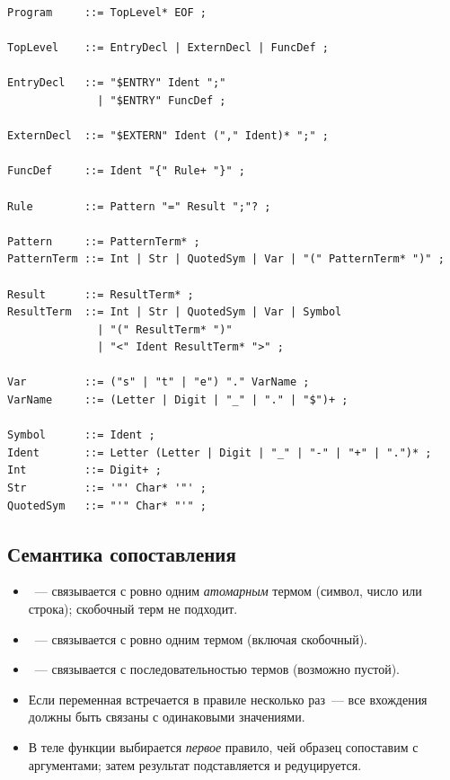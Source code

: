 \begin{lstlisting}[language={},caption={EBNF-грамматика базисного подмножества Refal-5},label={lst:ebnf}]
Program     ::= TopLevel* EOF ;

TopLevel    ::= EntryDecl | ExternDecl | FuncDef ;

EntryDecl   ::= "$ENTRY" Ident ";"
              | "$ENTRY" FuncDef ;

ExternDecl  ::= "$EXTERN" Ident ("," Ident)* ";" ;

FuncDef     ::= Ident "{" Rule+ "}" ;

Rule        ::= Pattern "=" Result ";"? ;

Pattern     ::= PatternTerm* ;
PatternTerm ::= Int | Str | QuotedSym | Var | "(" PatternTerm* ")" ;

Result      ::= ResultTerm* ;
ResultTerm  ::= Int | Str | QuotedSym | Var | Symbol
              | "(" ResultTerm* ")"
              | "<" Ident ResultTerm* ">" ;

Var         ::= ("s" | "t" | "e") "." VarName ;
VarName     ::= (Letter | Digit | "_" | "." | "$")+ ;

Symbol      ::= Ident ;
Ident       ::= Letter (Letter | Digit | "_" | "-" | "+" | ".")* ;
Int         ::= Digit+ ;
Str         ::= '"' Char* '"' ;
QuotedSym   ::= "'" Char* "'" ;
\end{lstlisting}

\subsection*{Семантика сопоставления}

\begin{itemize}
  \item {}~--- связывается с ровно одним \emph{атомарным} термом (символ, число или
        строка); скобочный терм не подходит.
  \item {}~--- связывается с ровно одним термом (включая скобочный).
  \item {}~--- связывается с последовательностью термов (возможно пустой).
  \item Если переменная встречается в правиле несколько раз~--- все вхождения должны быть
        связаны с одинаковыми значениями.
  \item В теле функции выбирается \emph{первое} правило, чей образец сопоставим с
        аргументами; затем результат подставляется и редуцируется.
\end{itemize}

